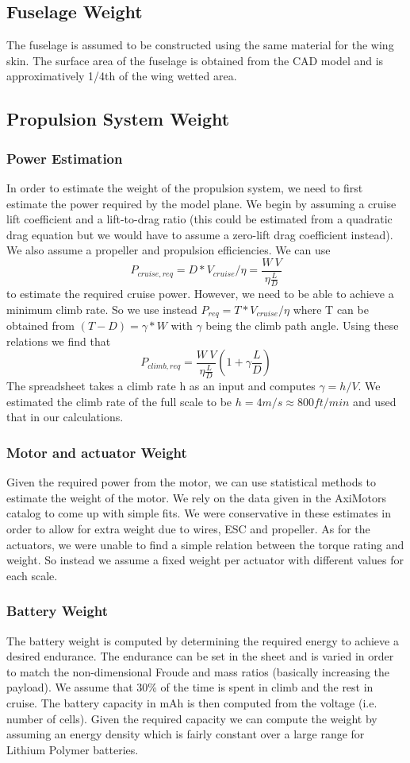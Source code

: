 \documentclass[titlepage,10pt]{article}
\begin{document}
\subsection{Fuselage Weight}
The fuselage is assumed to be constructed using the same material for the wing skin. The surface area of the fuselage is obtained from the CAD model and is approximatively 1/4th of the wing wetted area.

\subsection{Propulsion System Weight}
\subsubsection{Power Estimation}
In order to estimate the weight of the propulsion system, we need to first estimate the power required by the model plane. We begin by assuming a cruise lift coefficient and a lift-to-drag ratio (this could be estimated from a quadratic drag equation but we would have to assume a zero-lift drag coefficient instead). We also assume a propeller and propulsion efficiencies. We can use $$P_{cruise,req} = D*V_{cruise}/\eta = \frac{W\ V}{\eta \frac{L}{D}}$$ to estimate the required cruise power. However, we need to be able to achieve a minimum climb rate. So we use instead $P_{req} = T*V_{cruise}/\eta$ where T can be obtained from $(T-D)=\gamma*W$ with $\gamma$ being the climb path angle. Using these relations we find that $$P_{climb,req} = \frac{W\ V}{\eta \frac{L}{D}}(1+\gamma \frac{L}{D})$$
The spreadsheet takes a climb rate h as an input and computes $\gamma=h/V$. We estimated the climb rate of the full scale to be $h=4m/s\approx800ft/min$ and used that in our calculations.

\subsubsection{Motor and actuator Weight}
Given the required power from the motor, we can use statistical methods to estimate the weight of the motor. We rely on the data given in the AxiMotors catalog to come up with simple fits. We were conservative in these estimates in order to allow for extra weight due to wires, ESC and propeller. As for the actuators, we were unable to find a simple relation between the torque rating and weight. So instead we assume a fixed weight per actuator with different values for each scale.

\subsubsection{Battery Weight}
The battery weight is computed by determining the required energy to achieve a desired endurance. The endurance can be set in the sheet and is varied in order to match the non-dimensional Froude and mass ratios (basically increasing the payload). We assume that 30\% of the time is spent in climb and the rest in cruise. The battery capacity in mAh is then computed from the voltage (i.e. number of cells). Given the required capacity we can compute the weight by assuming an energy density which is fairly constant over a large range for Lithium Polymer batteries. 
\end{document}
